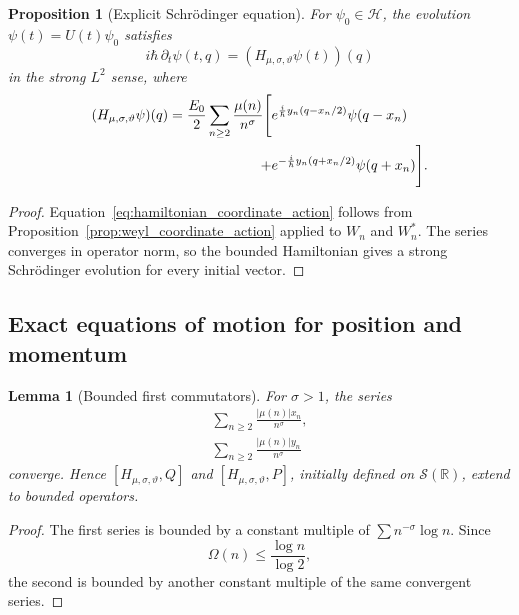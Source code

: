 \documentclass[11pt]{amsart}
\numberwithin{equation}{section}
\theoremstyle{plain}
\newtheorem{proposition}[theorem]{Proposition}
\newtheorem{lemma}[theorem]{Lemma}
\theoremstyle{definition}
\theoremstyle{remark}
\newcommand{\R}{\mathbb{R}}
\newcommand{\Hil}{\mathcal{H}}
\newcommand{\Sch}{\mathcal{S}}
\newcommand{\Om}{\Omega}
\begin{document}
\begin{proposition}[Explicit Schr\"odinger equation]
\label{prop:schrodinger_equation}
For $\psi_0\in\Hil$, the evolution $\psi(t)=U(t)\psi_0$ satisfies
\begin{equation}
i\hbar\,\partial_t\psi(t,q)
=
(H_{\mu,\sigma,\vartheta}\psi(t))(q)
\label{eq:schrodinger_equation}
\end{equation}
in the strong $L^2$ sense, where
\begin{align}
(H_{\mu,\sigma,\vartheta}\psi)(q)
=
\frac{E_0}{2}
\sum_{n\ge2}
\frac{\mu(n)}{n^{\sigma}}
\Bigg[
& e^{\frac{i}{\hbar}y_n(q-x_n/2)}\psi(q-x_n)
\notag\\
+{}&e^{-\frac{i}{\hbar}y_n(q+x_n/2)}\psi(q+x_n)
\Bigg].
\label{eq:hamiltonian_coordinate_action}
\end{align}
\end{proposition}

\begin{proof}
Equation~\eqref{eq:hamiltonian_coordinate_action} follows from
Proposition~\ref{prop:weyl_coordinate_action} applied to $W_n$ and $W_n^*$.
The series converges in operator norm, so the bounded Hamiltonian gives a
strong Schr\"odinger evolution for every initial vector.
\end{proof}

\subsection{Exact equations of motion for position and momentum}
\label{subsec:equations_of_motion}

\begin{lemma}[Bounded first commutators]
\label{lem:bounded_first_commutators}
For $\sigma>1$, the series
\begin{align}
\sum_{n\ge2}
\frac{|\mu(n)|x_n}{n^{\sigma}},
\label{eq:x_commutator_sum}\\
\sum_{n\ge2}
\frac{|\mu(n)|y_n}{n^{\sigma}}
\label{eq:y_commutator_sum}
\end{align}
converge.  Hence $[H_{\mu,\sigma,\vartheta},Q]$ and
$[H_{\mu,\sigma,\vartheta},P]$, initially defined on $\Sch(\R)$, extend to
bounded operators.
\end{lemma}

\begin{proof}
The first series is bounded by a constant multiple of
$\sum n^{-\sigma}\log n$.  Since
\begin{equation}
\Om(n)\le\frac{\log n}{\log2},
\label{eq:Omega_log_bound}
\end{equation}
the second is bounded by another constant multiple of the same convergent
series.
\end{proof}
\end{document}
